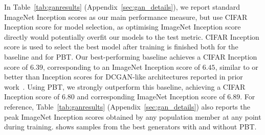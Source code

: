 In Table~\ref{tab:ganresults} (Appendix~\ref{sec:gan_details}),
we report standard ImageNet Inception scores as our main performance measure, but use CIFAR Inception score for model selection, as optimising ImageNet Inception score directly would potentially overfit our models to the test metric.
CIFAR Inception score is used to select the best model after training is finished both for the baseline and for PBT.
Our best-performing baseline achieves a CIFAR Inception score of $6.39$, corresponding to an ImageNet Inception score of $6.45
$, similar to or better than Inception scores for DCGAN-like architectures reported in prior work~\citep{mihaelaalphagan,improvedwgan,lrgan}.
Using PBT, we strongly outperform this baseline, achieving a CIFAR Inception score of $6.80$ and corresponding ImageNet Inception score of $6.89
$.
For reference,
Table~\ref{tab:ganresults} (Appendix~\ref{sec:gan_details}) also reports the peak ImageNet Inception scores obtained by any population member at any point during training.
 shows samples from the best generators with and without PBT.




